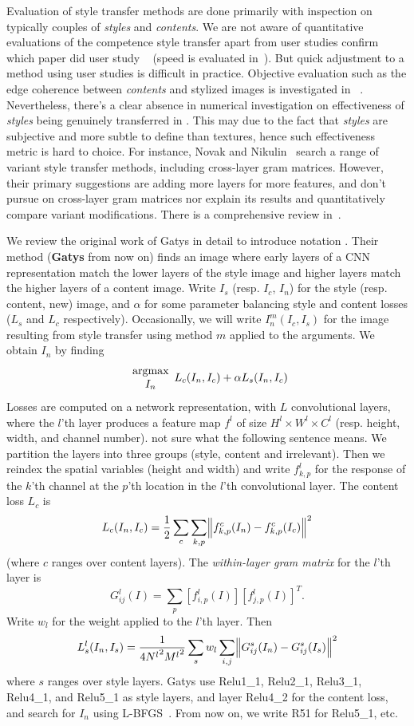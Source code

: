\documentclass[runningheads]{llncs}
\begin{document}
Evaluation of style transfer methods are done primarily with inspection on typically couples of {\em styles} and {\em contents}. We are not aware of quantitative evaluations of the competence style transfer apart from user studies \todo confirm which paper did user study ~\cite{li2018closed} (speed is evaluated in~\cite{}).  But quick adjustment to a method using user studies is difficult in practice.  Objective evaluation such as the edge coherence between {\em contents} and stylized images is investigated in  ~\cite{li2018closed}. Nevertheless, there's a clear absence in numerical investigation on effectiveness of {\em styles} being genuinely transferred in \cite{UST,gatys2016image,Johnson2016Perceptual}.  This may due to the fact that {\em styles} are subjective and more subtle to define than textures, hence such effectiveness metric is hard to choice. For instance, Novak and Nikulin~\cite{novak2016improving} search a range of variant style transfer methods, including cross-layer gram matrices. However, their primary suggestions are adding more layers for more features, and don't pursue on cross-layer gram matrices nor explain its results and quantitatively compare variant modifications. There is a comprehensive review in~\cite{jing2017neural}. 

We review the original work of Gatys \ea \cite{gatys2016image} in detail to introduce notation .
Their method ({\bf Gatys} from now on) finds an image where early layers of a CNN representation match the lower layers of the style image and higher layers match the higher layers of a content image.  Write $I_{s}$ (resp. $I_{c}$, $I_{n}$)  for the style (resp. content, new) image,
and $\alpha$ for some parameter balancing style and content losses ($L_s$ and $L_c$ respectively).  Occasionally, we
will write $I_n^m(I_c, I_s)$ for the image resulting from style transfer using method $m$ applied to the arguments.
We obtain $I_{n}$ by finding
\[
{\begin{array}{c}\mbox{argmax}\\{{I_{n}}}\end{array}} L_c(I_{n}, I_{c})+\alpha L_s(I_{n}, I_{c})
\]
Losses are computed on a network representation, with $L$ convolutional layers, where the $l$'th layer
produces a feature map $f^l$ of size $H^l \times W^l \times C^l$ (resp. height, width, and channel number). \todo not sure what the following sentence means. We partition
the layers into three groups (style, content and irrelevant). Then we reindex the spatial variables (height and width) and
write $f^l_{k,p}$ for the response of the $k$'th channel at the  $p$'th location in the $l$'th convolutional layer. The
content loss $L_c$ is 
\[
L_c(I_{n}, I_{c}) = \frac{1}{2}\sum_{c} \sum_{k,p} \norm{f^c_{k,p}(I_{n}) - f^c_{k,p}(I_{c})}^2
\]
(where $c$ ranges over content layers). The {\em within-layer gram
  matrix} for the $l$'th layer is
\[
G_{ij}^l(I) = \sum_p \left[f_{i,p}^l(I)\right]\left[f_{j,p}^l(I)\right]^{T}.
\]
Write $w_l$ for the weight applied to the $l$'th layer.  Then 
\[
L_s^l(I_{n}, I_{s}) = \frac{1}{4{N^l}^2{M^l}^2}\sum_{s}w_l \sum_{i,j}\norm{G^s_{ij}(I_{n})-G^s_{ij}(I_{s})}^2
\]
where $s$ ranges over style layers. Gatys \ea use Relu1\_1, Relu2\_1, Relu3\_1, Relu4\_1, and Relu5\_1 as style layers, and layer Relu4\_2 
for the content loss, and search for $I_{n}$ using L-BFGS~\cite{liu1989limited}.  From now on, we write R51 for Relu5\_1, etc. 
\end{document}

